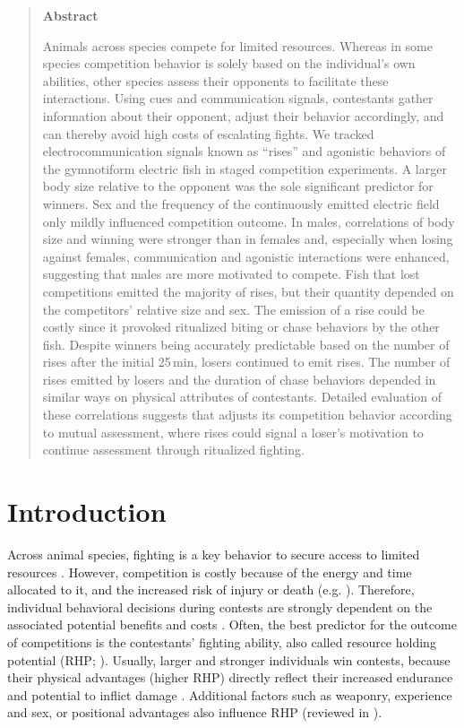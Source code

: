 \begin{quote}
\begin{center}
\large\textbf{Abstract}
\end{center}
Animals across species compete for limited resources. Whereas in some species competition behavior is solely based on the individual's own abilities, other species assess their opponents to facilitate these interactions. Using cues and communication signals, contestants gather information about their opponent, adjust their behavior accordingly, and can thereby avoid high costs of escalating fights. We tracked electrocommunication signals known as ``rises'' and agonistic behaviors of the gymnotiform electric fish \Lepto{} in staged competition experiments. A larger body size relative to the opponent was the sole significant predictor for winners. Sex and the frequency of the continuously emitted electric field only mildly influenced competition outcome. In males, correlations of body size and winning were stronger than in females and, especially when losing against females, communication and agonistic interactions were enhanced, suggesting that males are more motivated to compete. Fish that lost competitions emitted the majority of rises, but their quantity depended on the competitors' relative size and sex. The emission of a rise could be costly since it provoked ritualized biting or chase behaviors by the other fish. Despite winners being accurately predictable based on the number of rises after the initial 25\,min, losers continued to emit rises. The number of rises emitted by losers and the duration of chase behaviors depended in similar ways on physical attributes of contestants. Detailed evaluation of these correlations suggests that \lepto{} adjusts its competition behavior according to mutual assessment, where rises could signal a loser's motivation to continue assessment through ritualized fighting.
\end{quote}
\hfill

\section{Introduction}  %

Across animal species, fighting is a key behavior to secure access to limited resources \citep{Cluttonbrock1979, Chapman1995, Markham2015}. However, competition is costly because of the energy and time allocated to it, and the increased risk of injury or death (e.g. \citealp{Briffa2004}). Therefore, individual behavioral decisions during contests are strongly dependent on the associated potential benefits and costs \citep{ArnottElwood2008, ArnottElwood2009}. Often, the best predictor for the outcome of competitions is the contestants’ fighting ability, also called resource holding potential (RHP; \citealp{Parker1974}). Usually, larger and stronger individuals win contests, because their physical advantages (higher RHP) directly reflect their increased endurance and potential to inflict damage \citep{Archer1988}. Additional factors such as weaponry, experience and sex, or positional advantages also influence RHP (reviewed in \citealp{ArnottElwood2008}).


